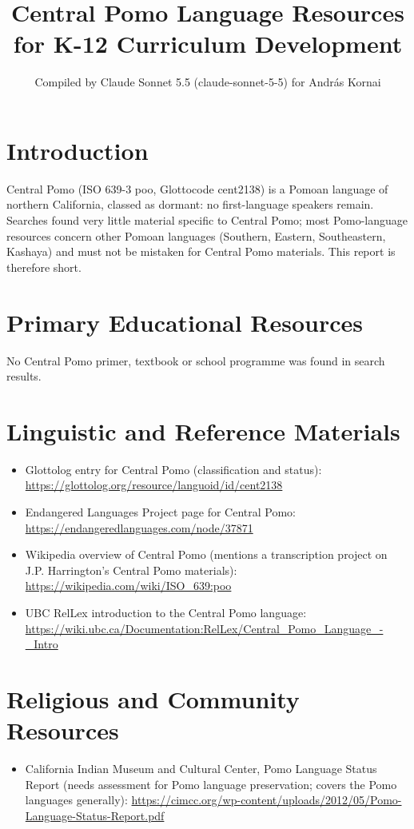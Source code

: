 \documentclass[12pt]{article}
\title{Central Pomo Language Resources for K-12 Curriculum Development}
\author{Compiled by Claude Sonnet 5.5 (claude-sonnet-5-5) for Andr\'as Kornai}
\date{}
\begin{document}
\maketitle
\section{Introduction}
Central Pomo (ISO 639-3 poo, Glottocode cent2138) is a Pomoan language of northern California, classed as dormant: no first-language speakers remain. Searches found very little material specific to Central Pomo; most Pomo-language resources concern other Pomoan languages (Southern, Eastern, Southeastern, Kashaya) and must not be mistaken for Central Pomo materials. This report is therefore short.
\section{Primary Educational Resources}
No Central Pomo primer, textbook or school programme was found in search results.
\section{Linguistic and Reference Materials}
\begin{itemize}
\item Glottolog entry for Central Pomo (classification and status): \url{https://glottolog.org/resource/languoid/id/cent2138}
\item Endangered Languages Project page for Central Pomo: \url{https://endangeredlanguages.com/node/37871}
\item Wikipedia overview of Central Pomo (mentions a transcription project on J.P. Harrington's Central Pomo materials): \url{https://wikipedia.com/wiki/ISO_639:poo}
\item UBC RelLex introduction to the Central Pomo language: \url{https://wiki.ubc.ca/Documentation:RelLex/Central_Pomo_Language_-_Intro}
\end{itemize}
\section{Religious and Community Resources}
\begin{itemize}
\item California Indian Museum and Cultural Center, Pomo Language Status Report (needs assessment for Pomo language preservation; covers the Pomo languages generally): \url{https://cimcc.org/wp-content/uploads/2012/05/Pomo-Language-Status-Report.pdf}
\end{itemize}
\end{document}
